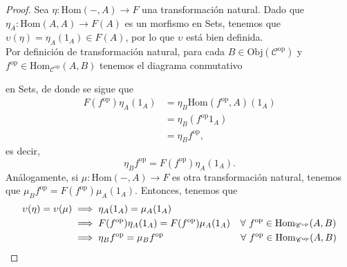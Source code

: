 \documentclass[tesis]{subfiles}
\begin{document}
\begin{proof}


    Sea $\eta:\text{Hom}(-,A)\to F$ una transformación natural. Dado que $\eta_A:\text{Hom}(A,A)\to F(A)$ es un morfismo en Sets, tenemos que $\upsilon(\eta) = \eta_A(1_A)\in F(A)$, por lo que $\upsilon$ está bien definida. \\

    Por definición de transformación natural, para cada $B\in\text{Obj}(\mathscr{C}^\text{op})$ y $f^\text{op}\in\text{Hom}_{\mathscr{C}^\text{op}}(A,B)$ tenemos el diagrama conmutativo
    \begin{center}
    \end{center}
    en Sets, de donde se sigue que
    \begin{align*}
        F(f^\text{op})\eta_A(1_A) &= \eta_B\text{Hom}(f^\text{op},A)(1_A) \\
                        &= \eta_B(f^\text{op}1_A) \\
                        &= \eta_Bf^\text{op},
    \end{align*}
    es decir,
    \begin{equation}\label{eq: Lema de Yoneda 1}
        \eta_B f^\text{op} = F(f^\text{op})\eta_A(1_A).
    \end{equation}
    Análogamente, si $\mu:\text{Hom}(-,A)\to F$ es otra transformación natural, tenemos que $\mu_B f^\text{op} = F(f^\text{op})\mu_A(1_A)$. Entonces, tenemos que
    \begin{align*}
        \upsilon(\eta) = \upsilon(\mu) &\implies \eta_A(1_A) = \mu_A(1_A) \\
                                          &\implies F(f^\text{op})\eta_A(1_A) = F(f^\text{op})\mu_A(1_A) \quad \hspace{0.2mm} \forall \ f^\text{op}\in\text{Hom}_{\mathscr{C}^\text{op}}(A,B) \\
                            &\implies \eta_Bf^\text{op} = \mu_Bf^\text{op} \quad \quad \quad \quad \quad \quad \quad \quad \forall \ f^\text{op}\in \text{Hom}_{\mathscr{C}^\text{op}}(A,B) \\

\end{align*}
\end{proof}
\end{document}
